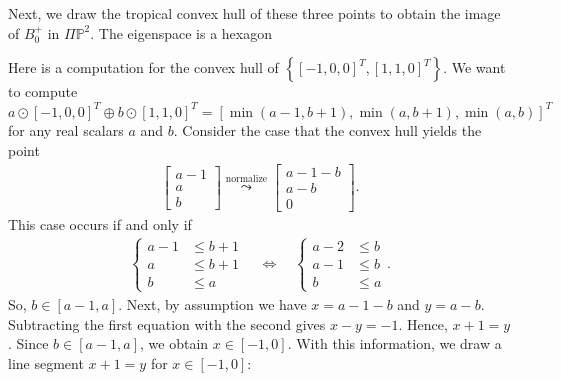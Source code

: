 \documentclass{article}
\begin{document}
\begin{itemize}
\begin{figure}[H]
		\end{figure}
		Next, we draw the tropical convex hull of these three points to obtain the image of \( B^+_0 \) in \( \Pi \mathbb{P}^2 \). The eigenspace is a hexagon
		\begin{figure}[H]
			\centering
		\end{figure}
		Here is a computation for the convex hull of \( \left\{ [-1,0, 0]^T, [1,1,0]^T \right\} \). We want to compute \( a \odot [-1, 0, 0]^T \oplus b \odot [1,1,0]^T = [\min(a-1,b+1), \min(a, b+1), \min(a,b)]^T \) for any real scalars \( a \) and \( b \). Consider the case that the convex hull yields the point 
		\begin{align*}
			\begin{bmatrix}
				a-1 \\ a \\ b
			\end{bmatrix} \overset{\text{normalize}}{\leadsto} \begin{bmatrix}
				a-1-b \\ a-b \\ 0
			\end{bmatrix}.
		\end{align*}
		This case occurs if and only if
		\begin{align*}
			\begin{cases}
				a-1 &\leq b + 1 \\
				a 	&\leq b+1 \\
				b 	&\leq a
			\end{cases} \quad \iff \quad
			\begin{cases}
				a - 2 &\leq b \\
				a - 1 &\leq b \\
				b 		&\leq a
			\end{cases}.
		\end{align*}
		So, \( b \in [a-1, a] \). Next, by assumption we have  \( x = a - 1 - b \) and \( y = a-b \). Subtracting the first equation with the second gives \( x - y = - 1 \). Hence, \( x + 1 = y \). Since \( b \in [a-1, a] \), we obtain \( x \in [-1,0] \). With this information, we draw a line segment \( x + 1 = y \) for \( x \in [-1,0] \):
		\begin{figure}[H]
			\centering
\end{figure}
\end{itemize}
\end{document}
